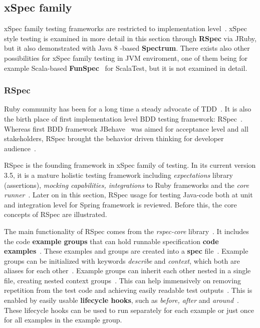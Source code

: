     \subsection{xSpec family}
    xSpec family testing frameworks are restricted to implementation level~\cite{solis2011study}. xSpec style testing
    is examined in more detail in this section through \textbf{RSpec} via JRuby, but it also demonstrated with
    Java 8 -based \textbf{Spectrum}. There exists also other possibilities for xSpec family testing in JVM enviroment,
    one of them being for example Scala-based \textbf{FunSpec}~\cite{funspec} for ScalaTest, but it is not examined in detail.

    \subsubsection{RSpec}
    Ruby community has been for a long time a steady advocate of TDD~\cite{lerner2009forge}. It is also the birth place
    of first implementation level BDD testing framework: RSpec~\cite{astels2006new}. Whereas first BDD framework
    JBehave~\cite{bdd2006north} was aimed for acceptance level and all stakeholders, RSpec brought the behavior driven thinking for developer
    audience~\cite{astels2006new}.

    RSpec is the founding framework in xSpec family of testing. In its current version 3.5, it is a mature holistic testing
    framework including \textit{expectations} library (assertions), \textit{mocking capabilities, integrations} to Ruby frameworks and the \textit{core runner}~\cite{rspecdoc}.
    Later on in this section, RSpec usage for testing Java-code both at unit and integration level for Spring framework is reviewed.
    Before this, the core concepts of RSpec are illustrated.

    The main functionality of RSpec comes from the \textit{rspec-core} library~\cite{rspecdoc}. It includes the code \textbf{example groups} that can hold runnable
    specification \textbf{code examples}~\cite{chelimsky2010rspec}. These examples and groups are created into a \textbf{spec} file~\cite{chelimsky2010rspec}.
    Example groups can be initialized with keywords \textit{describe}
    and \textit{context}, which both are aliases for each other~\cite{rspec-core}. Example groups can inherit each other nested in a single
    file, creating nested context groups~\cite{rspec-core}. This can help immensively on removing repetition from the test code
    and achieving easily readable test outputs~\cite{chelimsky2010rspec}. This is enabled by easily usable \textbf{lifecycle hooks},
    such as \textit{before, after} and \textit{around}~\cite{chelimsky2010rspec}.
    These lifecycle hooks can be used to run separately for each example or just once for all examples in the example group.

